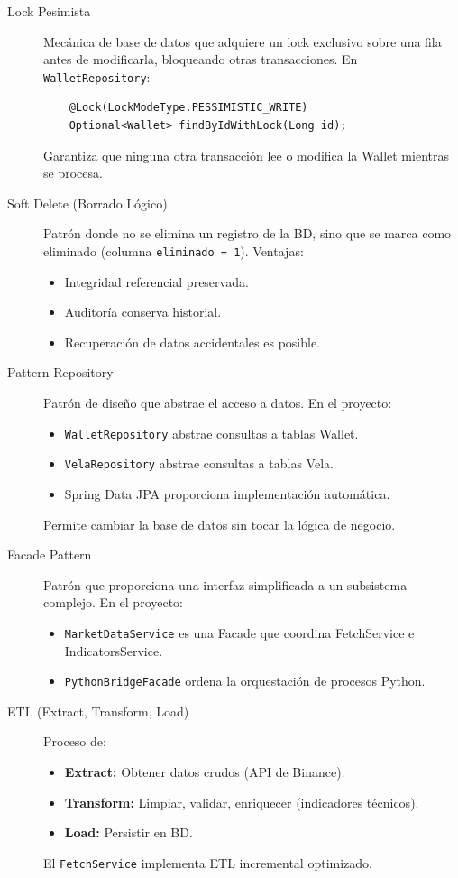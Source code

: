 \begin{description}
    \item[Lock Pesimista] Mecánica de base de datos que adquiere un lock exclusivo sobre una fila antes de modificarla, bloqueando otras transacciones. En \texttt{WalletRepository}:
    \begin{verbatim}
    @Lock(LockModeType.PESSIMISTIC_WRITE)
    Optional<Wallet> findByIdWithLock(Long id);
    \end{verbatim}
    Garantiza que ninguna otra transacción lee o modifica la Wallet mientras se procesa.

    \item[Soft Delete (Borrado Lógico)] Patrón donde no se elimina un registro de la BD, sino que se marca como eliminado (columna \texttt{eliminado = 1}). Ventajas:
    \begin{itemize}
        \item Integridad referencial preservada.
        \item Auditoría conserva historial.
        \item Recuperación de datos accidentales es posible.
    \end{itemize}

    \item[Pattern Repository] Patrón de diseño que abstrae el acceso a datos. En el proyecto:
    \begin{itemize}
        \item \texttt{WalletRepository} abstrae consultas a tablas Wallet.
        \item \texttt{VelaRepository} abstrae consultas a tablas Vela.
        \item Spring Data JPA proporciona implementación automática.
    \end{itemize}
    Permite cambiar la base de datos sin tocar la lógica de negocio.

    \item[Facade Pattern] Patrón que proporciona una interfaz simplificada a un subsistema complejo. En el proyecto:
    \begin{itemize}
        \item \texttt{MarketDataService} es una Facade que coordina FetchService e IndicatorsService.
        \item \texttt{PythonBridgeFacade} ordena la orquestación de procesos Python.
    \end{itemize}

    \item[ETL (Extract, Transform, Load)] Proceso de:
    \begin{itemize}
        \item \textbf{Extract:} Obtener datos crudos (API de Binance).
        \item \textbf{Transform:} Limpiar, validar, enriquecer (indicadores técnicos).
        \item \textbf{Load:} Persistir en BD.
    \end{itemize}
    El \texttt{FetchService} implementa ETL incremental optimizado.


\end{description}
